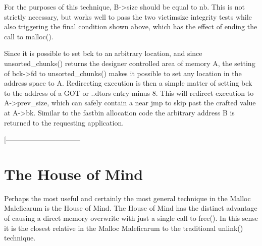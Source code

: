 \documentclass[12pt]{article}
\begin{document}
For the purposes of this technique, B->size should be equal to nb.
This is not strictly necessary, but works well to pass the two
victimsize integrity tests while also triggering the final
condition shown above, which has the effect of ending the call to
malloc().

Since it is possible to set bck to an arbitrary location, and since
unsorted\_chunks() returns the designer controlled area of memory A,
the setting of bck->fd to unsorted\_chunks() makes it possible to
set any location in the address space to A. Redirecting execution
is then a simple matter of setting bck to the address of a GOT or
..dtors entry minus 8. This will redirect execution to A->prev_size,
which can safely contain a near jmp to skip past the crafted value
at A->bk. Similar to the fastbin allocation code the arbitrary
address B is returned to the requesting application.

[--------------------------------

\section{The House of Mind}

Perhaps the most useful and certainly the most general technique in
the Malloc Maleficarum is the House of Mind. The House of Mind has
the distinct advantage of causing a direct memory overwrite with
just a single call to free(). In this sense it is the closest
relative in the Malloc Maleficarum to the traditional unlink()
technique.
\end{document}
